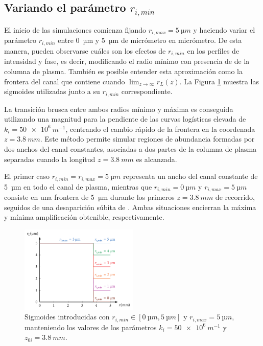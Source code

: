 \subsection{Variando el parámetro $r_{i,min}$}\label{sec:4.1.1}
El inicio de las simulaciones comienza fijando $r_{i,max}=\qty{5}{µm}$ y haciendo variar el parámetro $r_{i,min}$ entre \qty{0}{µm} y \qty{5}{µm} de micrómetro en micrómetro. De esta manera, pueden observarse cuáles son los efectos de $r_{i,min}$ en los perfiles de intensidad y fase, es decir, modificando el radio mínimo con presencia de  de la columna de plasma. También es posible entender esta aproximación como la frontera del canal que contiene  cuando $\lim_{z \to \infty}r_{L}(z)$. La Figura \ref{fig:4.5} muestra las sigmoides utilizadas junto a su $r_{i,min}$ correspondiente.

La transición brusca entre ambos radios mínimo y máxima es conseguida utilizando una magnitud para la pendiente de las curvas logísticas elevada de $k_{i}=\qty{50e6}{m^{-1}}$, centrando el cambio rápido de la frontera en la coordenada $z=\qty{3.8}{mm}$. Este método permite simular regiones de abundancia formadas por dos anchos del canal constantes, asociadas a dos partes de la columna de plasma separadas cuando la longitud $z=\qty{3.8}{mm}$ es alcanzada. 

El primer caso $r_{i,min}=r_{i,max}=\qty{5}{µm}$ representa un ancho del canal constante de \qty{5}{µm} en todo el canal de plasma, mientras que $r_{i,min}=\qty{0}{µm}$ y $r_{i,max}=\qty{5}{µm}$ consiste en una frontera de \qty{5}{µm} durante los primeros $z=\qty{3.8}{mm}$ de recorrido, seguidos de una desaparición súbita de . Ambas situaciones encierran la máxima y mínima amplificación obtenible, respectivamente.

\begin{figure}[htbp]
  \centering
  \includegraphics[width=0.5\textwidth]{Figuras/ch4_sigm_rmin.pdf}
  \caption{Sigmoides introducidas con $r_{i,min}\in[\qty{0}{µm},\qty{5}{µm}]$ y $r_{i,max}=\qty{5}{µm}$, manteniendo los valores de los parámetros $k_{i}=\qty{50e6}{m^{-1}}$ y $z_{0i}=\qty{3.8}{mm}$.}
  \label{fig:4.5}
\end{figure}

